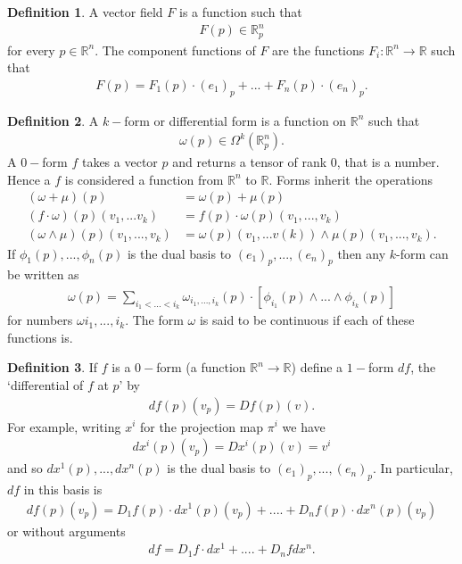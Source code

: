 \documentclass[20pt]{article}
\theoremstyle{plain}
\theoremstyle{definition}
\newtheorem{definition}{Definition}
\newcommand{\reals}{\mathbb{R}}
\begin{document}
\begin{definition}
  A vector field $F$ is a function such that 
  \begin{align*}
    F(p) \in \reals^n_p
  \end{align*}
  for every $p \in \reals^n.$  The component functions of $F$ are the functions 
  $F_i: \reals^n \to \reals$ such that 
  \begin{align*}
    F(p) = F_1(p)\cdot(e_1)_p + ... + F_n(p)\cdot(e_n)_p.
  \end{align*}
\end{definition}

\begin{definition}
  A $k-$form or differential form is a function on $\reals^n$ such that
  \begin{align*}
    \omega(p) \in \Omega^k(\reals^n_p).
  \end{align*}
  A $0-$form $f$ takes a vector $p$ and returns a tensor of rank $0$, that is a number.
  Hence a $f$ is considered a function from $\reals^n$ to $\reals.$
  Forms inherit the operations
  \begin{align*}
    (\omega + \mu)(p) &= \omega(p) + \mu(p)\\
    (f \cdot \omega)(p)(v_1, ...v_k) &= f(p) \cdot \omega(p)(v_1, ..., v_k)\\
    (\omega \wedge \mu)(p)(v_1, ..., v_k) &= \omega(p)(v_1,...v(k)) \wedge \mu(p)(v_1, ..., v_k).
  \end{align*}
  If $\phi_1(p), ..., \phi_n(p)$ is the dual basis to $(e_1)_p, ..., (e_n)_p$ then any $k$-form can be written as
  \begin{align*}
    \omega(p) = \sum_{i_1<...<i_k} \omega_{i_1, ..., i_k}(p)\cdot[\phi_{i_1}(p)\wedge...\wedge\phi_{i_k}(p)]
  \end{align*}
  for numbers $\omega{i_1,...,i_k}$.  The form $\omega$ is said to be continuous if each of these functions is.

  \end{definition}

  \begin{definition}
    If $f$ is a $0-$form (a function $\reals^n \to \reals$) define a $1-$form $df$, the  `differential of $f$ at $p$' by
    \begin{align*}
      df(p)(v_p) = Df(p)(v).
    \end{align*}
    For example, writing $x^i$ for the projection map $\pi^i$ we have 
    \begin{align*}
      dx^i(p)(v_p) = Dx^i(p)(v) = v^i
    \end{align*}
    and so $dx^1(p), ..., dx^n(p)$ is the dual basis to $(e_1)_p, ..., (e_n)_p.$ 
    In particular, $df$ in this basis is 
    \begin{align*}
      df(p)(v_p) = D_1f(p) \cdot dx^1(p)(v_p) + .... + D_nf(p)\cdot dx^n(p)(v_p)
    \end{align*}
    or without arguments 
    \begin{align*}
      df = D_1f\cdot dx^1 + .... + D_nf dx^n.
    \end{align*}
  \end{definition}
\end{document}
